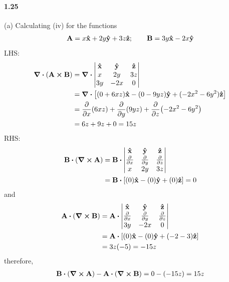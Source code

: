 \documentclass[../main.tex]{subfiles}
\begin{document}
\paragraph{1.25}
(a) Calculating (iv) for the functions
\begin{align*}
    \vb{A} = x\vu{x} + 2y\vu{y} + 3z\vu{z}; \qquad \vb{B} = 3y\vu{x} - 2x\vu{y}
\end{align*}
LHS:
\begin{align*}
    \div(\vb{A} \cp \vb{B}) &= \div \begin{vmatrix}
        \vu{x} & \vu{y} & \vu{z} \\
        x & 2y & 3z \\
        3y & -2x & 0
    \end{vmatrix} \\
    &= \div [(0 + 6xz)\vu{x} - (0 - 9yz)\vu{y} + (-2x^2 - 6y^2)\vu{z}] \\
    &= \pdv{x}(6xz) + \pdv{y}(9yz) + \pdv{z}(-2x^2 - 6y^2) \\
    &= 6z + 9z + 0 = 15z
\end{align*}
RHS:
\begin{align*}
    \vb{B} \vdot (\curl{\vb{A}}) &= \vb{B} \vdot \begin{vmatrix}
        \vu{x} & \vu{y} & \vu{z} \\
        \pdv{x} & \pdv{y} & \pdv{z} \\
        x & 2y & 3z
    \end{vmatrix} \\
    &= \vb{B} \vdot [(0)\vu{x} - (0)\vu{y} + (0)\vu{z}] = 0
\end{align*}
and
\begin{align*}
    \vb{A} \vdot (\curl{\vb{B}}) &= \vb{A} \vdot \begin{vmatrix}
        \vu{x} & \vu{y} & \vu{z} \\
        \pdv{x} & \pdv{y} & \pdv{z} \\
        3y & -2x & 0
    \end{vmatrix} \\
    &= \vb{A} \vdot [(0)\vu{x} - (0)\vu{y} + (-2 - 3)\vu{z}] \\
    &= 3z (-5) = -15z
\end{align*}
therefore,
\begin{align*}
    \vb{B} \vdot (\curl{\vb{A}}) - \vb{A} \vdot (\curl{\vb{B}}) &= 0 - (-15z) = 15z \\
\end{align*}
\end{document}
